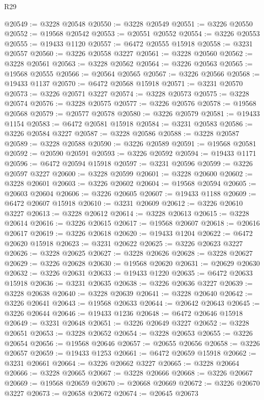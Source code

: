\begin{lexlean}{R29}
\begin{coremodule}
@20549 := @3228 @20548
@20550 := @3228 @20549
@20551 := @3226 @20550
@20552 := @19568 @20542
@20553 := @20551 @20552
@20554 := @3226 @20553
@20555 := @19433 @1120
@20557 := @6472 @20555 @15918
@20558 := @3231 @20557
@20560 := @3226 @20558 @3227
@20561 := @3228 @20560
@20562 := @3228 @20561
@20563 := @3228 @20562
@20564 := @3226 @20563
@20565 := @19568 @20555
@20566 := @20564 @20565
@20567 := @3226 @20566
@20568 := @19433 @1137
@20570 := @6472 @20568 @15918
@20571 := @3231 @20570
@20573 := @3226 @20571 @3227
@20574 := @3228 @20573
@20575 := @3228 @20574
@20576 := @3228 @20575
@20577 := @3226 @20576
@20578 := @19568 @20568
@20579 := @20577 @20578
@20580 := @3226 @20579
@20581 := @19433 @1154
@20583 := @6472 @20581 @15918
@20584 := @3231 @20583
@20586 := @3226 @20584 @3227
@20587 := @3228 @20586
@20588 := @3228 @20587
@20589 := @3228 @20588
@20590 := @3226 @20589
@20591 := @19568 @20581
@20592 := @20590 @20591
@20593 := @3226 @20592
@20594 := @19433 @1171
@20596 := @6472 @20594 @15918
@20597 := @3231 @20596
@20599 := @3226 @20597 @3227
@20600 := @3228 @20599
@20601 := @3228 @20600
@20602 := @3228 @20601
@20603 := @3226 @20602
@20604 := @19568 @20594
@20605 := @20603 @20604
@20606 := @3226 @20605
@20607 := @19433 @1188
@20609 := @6472 @20607 @15918
@20610 := @3231 @20609
@20612 := @3226 @20610 @3227
@20613 := @3228 @20612
@20614 := @3228 @20613
@20615 := @3228 @20614
@20616 := @3226 @20615
@20617 := @19568 @20607
@20618 := @20616 @20617
@20619 := @3226 @20618
@20620 := @19433 @1204
@20622 := @6472 @20620 @15918
@20623 := @3231 @20622
@20625 := @3226 @20623 @3227
@20626 := @3228 @20625
@20627 := @3228 @20626
@20628 := @3228 @20627
@20629 := @3226 @20628
@20630 := @19568 @20620
@20631 := @20629 @20630
@20632 := @3226 @20631
@20633 := @19433 @1220
@20635 := @6472 @20633 @15918
@20636 := @3231 @20635
@20638 := @3226 @20636 @3227
@20639 := @3228 @20638
@20640 := @3228 @20639
@20641 := @3228 @20640
@20642 := @3226 @20641
@20643 := @19568 @20633
@20644 := @20642 @20643
@20645 := @3226 @20644
@20646 := @19433 @1236
@20648 := @6472 @20646 @15918
@20649 := @3231 @20648
@20651 := @3226 @20649 @3227
@20652 := @3228 @20651
@20653 := @3228 @20652
@20654 := @3228 @20653
@20655 := @3226 @20654
@20656 := @19568 @20646
@20657 := @20655 @20656
@20658 := @3226 @20657
@20659 := @19433 @1253
@20661 := @6472 @20659 @15918
@20662 := @3231 @20661
@20664 := @3226 @20662 @3227
@20665 := @3228 @20664
@20666 := @3228 @20665
@20667 := @3228 @20666
@20668 := @3226 @20667
@20669 := @19568 @20659
@20670 := @20668 @20669
@20672 := @3226 @20670 @3227
@20673 := @20658 @20672
@20674 := @20645 @20673

\end{coremodule}
\end{lexlean}
